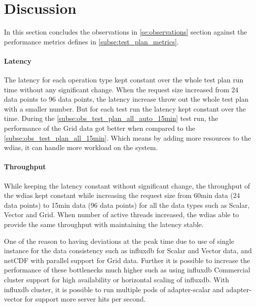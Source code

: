 \section{Discussion}


In this section concludes the observations in \ref{se:observations} section against the performance metrics defines in \ref{subse:test_plan_metrics}.

\paragraph{Latency}
The latency for each operation type kept constant over the whole test plan run time without any significant change. When the request size increased from 24 data points to 96 data points, the latency increase throw out the whole test plan with a smaller number. But for each test run the latency kept constant over the time.
During the \ref{subse:obs_test_plan_all_auto_15min} test run, the performance of the Grid data got better when compared to the \ref{subse:obs_test_plan_all_15min}. Which means by adding more resources to the \acrshort{wdias}, it can handle more workload on the system.

\paragraph{Throughput}
While keeping the latency constant without significant change, the throughput of the \acrshort{wdias} kept constant while increasing the request size from 60min data (24 data points) to 15min data (96 data points) for all the data types such as Scalar, Vector and Grid.
When number of active threads increased, the \acrshort{wdias} able to provide the same throughput with maintaining the latency stable.

One of the reason to having deviations at the peak time due to use of single instance for the data consistency such as \acrshort{influxdb} for Scalar and Vector data, and netCDF with parallel support for Grid data. Further it is possible to increase the performance of these bottlenecks much higher such as using \acrshort{influxdb} Commercial cluster support for high availability or horizontal scaling of \acrshort{influxdb}. With \acrshort{influxdb} cluster, it is possible to run multiple pods of adapter-scalar and adapter-vector for support more server hits per second.

